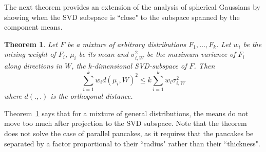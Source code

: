 \documentclass{book}
\newtheorem{theorem}{Theorem}[chapter]
\numberwithin{exercise}{chapter}
\begin{document}


The next theorem provides an extension of the analysis of spherical Gaussians by showing when the SVD subspace is ``close" to the subspace spanned by the component means.

\begin{theorem}\label{thm:genmix}
Let $F$ be a mixture of arbitrary distributions $F_1,\ldots,F_k$. Let $w_i$ be the mixing weight
of $F_i$, $\mu_i$ be its mean and $\sigma^2_{i,W}$ be the maximum variance of $F_i$ along directions in $W$, the $k$-dimensional SVD-subspace of $F$. Then
\[\sum_{i=1}^k w_i d(\mu_i,W)^2 \le k \sum_{i=1}^k w_i \sigma^2_{i,W}\]
where $d(.,.)$ is the orthogonal distance.
\end{theorem}

 Theorem~\ref{thm:genmix} says that for a mixture of general distributions, the means do not move too much after projection
 to the SVD subspace. Note that the theorem does not solve the case of parallel pancakes, as it requires that the pancakes be separated by a factor proportional to their ``radius" rather than their ``thickness".

\end{document}

